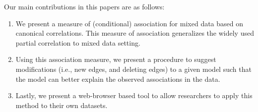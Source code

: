 \documentclass[letterpaper]{article} %
\begin{document}

Our main contributions in this papers are as follows:
\begin{enumerate}
	\item We present a measure of (conditional) association for mixed data
		based on canonical correlations. This measure of association
		generalizes the widely used partial correlation to mixed data
		setting.
	\item Using this association measure, we present a procedure to suggest
		modifications (i.e., new edges, and deleting edges) to a given
		model such that the model can better explain the observed
		associations in the data. 
	\item Lastly, we present a web-browser based tool to allow researchers
		to apply this method to their own datasets.
\end{enumerate}
\end{document}
